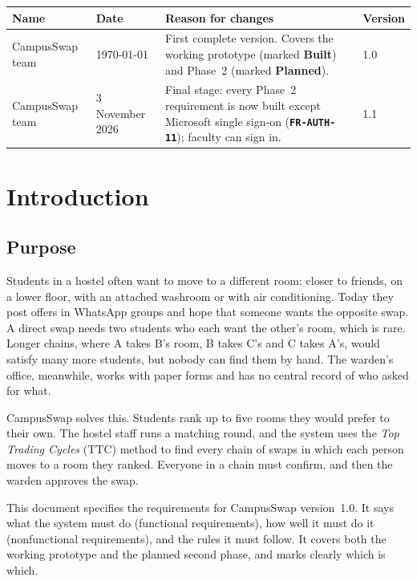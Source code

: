 \documentclass[11pt,a4paper,parskip=half,toc=listof]{scrreprt}
\newcommand{\DocDate}{\today}
\newcommand{\Built}{\textcolor{builtgreen}{\textbf{Built}}}
\newcommand{\Planned}{\textcolor{plannedamber}{\textbf{Planned}}}
\newcommand{\Req}[1]{\textbf{\texttt{#1}}}
\begin{document}
\begin{xltabular}{\linewidth}{@{}l l Y l@{}}
  \toprule
  \textbf{Name} & \textbf{Date} & \textbf{Reason for changes} & \textbf{Version}\\
  \midrule
  CampusSwap team & \DocDate & First complete version. Covers the working
  prototype (marked \Built) and Phase~2 (marked \Planned). & 1.0\\
  CampusSwap team & 3 November 2026 & Final stage: every Phase~2 requirement
  is now built except Microsoft single sign-on (\Req{FR-AUTH-11}); faculty
  can sign in. & 1.1\\
  \bottomrule
\end{xltabular}

\tableofcontents
\listoffigures
\listoftables

\chapter{Introduction}\label{ch:intro}

\section{Purpose}

Students in a hostel often want to move to a different room: closer to
friends, on a lower floor, with an attached washroom or with air
conditioning. Today they post offers in WhatsApp groups and hope that
someone wants the opposite swap. A direct swap needs two students who each
want the other's room, which is rare. Longer chains, where A takes B's
room, B takes C's and C takes A's, would satisfy many more students, but
nobody can find them by hand. The warden's office, meanwhile, works with
paper forms and has no central record of who asked for what.

CampusSwap solves this. Students rank up to five rooms they would prefer
to their own. The hostel staff runs a matching round, and the system uses
the \emph{Top Trading Cycles} (TTC) method to find every chain of swaps in
which each person moves to a room they ranked. Everyone in a chain must
confirm, and then the warden approves the swap.

This document specifies the requirements for CampusSwap version~1.0. It
says what the system must do (functional requirements), how well it must
do it (nonfunctional requirements), and the rules it must follow. It covers
both the working prototype and the planned second phase, and marks clearly
which is which.
\end{document}

